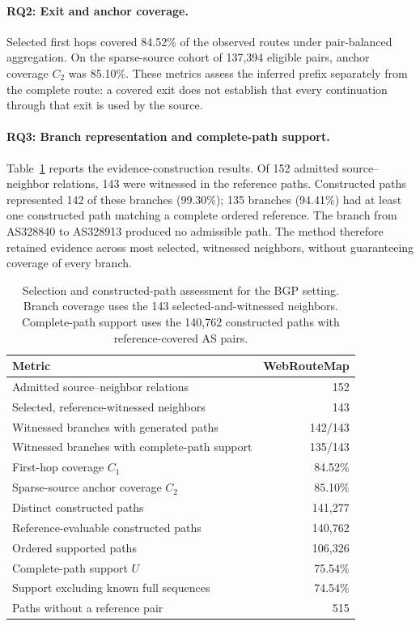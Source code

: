 \documentclass[sigconf,anonymous,review]{acmart}
\newcommand{\sys}{\mbox{WebRouteMap}\xspace}
\begin{document}
\paragraph{RQ2: Exit and anchor coverage.}
Selected first hops covered 84.52\% of the observed routes under pair-balanced
aggregation. On the sparse-source cohort of 137,394 eligible pairs, anchor
coverage $C_2$ was 85.10\%. These metrics assess the inferred prefix
separately from the complete route: a covered exit does not establish that
every continuation through that exit is used by the source.

\paragraph{RQ3: Branch representation and complete-path support.}
Table~\ref{tab:stage_results} reports the evidence-construction results.
Of 152 admitted source--neighbor relations, 143 were witnessed in the
reference paths. Constructed paths represented 142 of these branches
(99.30\%); 135 branches (94.41\%) had at least one constructed path matching
a complete ordered reference. The branch from AS328840 to AS328913
produced no admissible path. The method therefore retained evidence across
most selected, witnessed neighbors, without guaranteeing coverage of every
branch.

\begin{table}[t]
\centering
\caption{Selection and constructed-path assessment for the BGP setting.
Branch coverage uses the 143 selected-and-witnessed neighbors. Complete-path
support uses the 140,762 constructed paths with reference-covered AS pairs.}
\label{tab:stage_results}
\footnotesize
\setlength{\tabcolsep}{3pt}
\begin{tabularx}{\columnwidth}{@{}Xr@{}}
\toprule
Metric & \sys\\
\midrule
Admitted source--neighbor relations & 152\\
Selected, reference-witnessed neighbors & 143\\
Witnessed branches with generated paths & 142/143\\
Witnessed branches with complete-path support & 135/143\\
First-hop coverage $C_1$ & 84.52\%\\
Sparse-source anchor coverage $C_2$ & 85.10\%\\
Distinct constructed paths & 141,277\\
Reference-evaluable constructed paths & 140,762\\
Ordered supported paths & 106,326\\
Complete-path support $U$ & 75.54\%\\
Support excluding known full sequences & 74.54\%\\
Paths without a reference pair & 515\\
\bottomrule
\end{tabularx}
\end{table}
\end{document}
